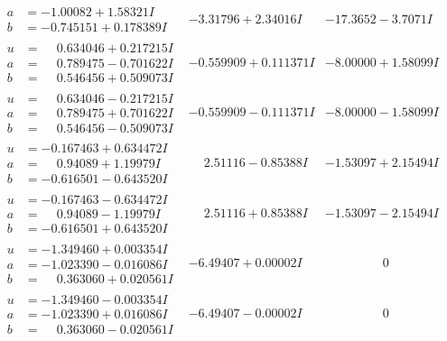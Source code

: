 \documentclass[1p]{elsarticle_modified}
\theoremstyle{definition}
\begin{document}
$$\begin{array}{c|c|c}
\begin{aligned}
a &= -1.00082 + 1.58321 I \\
b &= -0.745151 + 0.178389 I\end{aligned}
 & -3.31796 + 2.34016 I & -17.3652 - 3.7071 I \\ \hline\begin{aligned}
u &= \phantom{-}0.634046 + 0.217215 I \\
a &= \phantom{-}0.789475 - 0.701622 I \\
b &= \phantom{-}0.546456 + 0.509073 I\end{aligned}
 & -0.559909 + 0.111371 I & -8.00000 + 1.58099 I \\ \hline\begin{aligned}
u &= \phantom{-}0.634046 - 0.217215 I \\
a &= \phantom{-}0.789475 + 0.701622 I \\
b &= \phantom{-}0.546456 - 0.509073 I\end{aligned}
 & -0.559909 - 0.111371 I & -8.00000 - 1.58099 I \\ \hline\begin{aligned}
u &= -0.167463 + 0.634472 I \\
a &= \phantom{-}0.94089 + 1.19979 I \\
b &= -0.616501 - 0.643520 I\end{aligned}
 & \phantom{-}2.51116 - 0.85388 I & -1.53097 + 2.15494 I \\ \hline\begin{aligned}
u &= -0.167463 - 0.634472 I \\
a &= \phantom{-}0.94089 - 1.19979 I \\
b &= -0.616501 + 0.643520 I\end{aligned}
 & \phantom{-}2.51116 + 0.85388 I & -1.53097 - 2.15494 I \\ \hline\begin{aligned}
u &= -1.349460 + 0.003354 I \\
a &= -1.023390 - 0.016086 I \\
b &= \phantom{-}0.363060 + 0.020561 I\end{aligned}
 & -6.49407 + 0.00002 I & \phantom{-0.000000 } 0 \\ \hline\begin{aligned}
u &= -1.349460 - 0.003354 I \\
a &= -1.023390 + 0.016086 I \\
b &= \phantom{-}0.363060 - 0.020561 I\end{aligned}
 & -6.49407 - 0.00002 I & \phantom{-0.000000 } 0 \\ \hline\begin{aligned}

\end{aligned}
\end{array}$$
\end{document}
